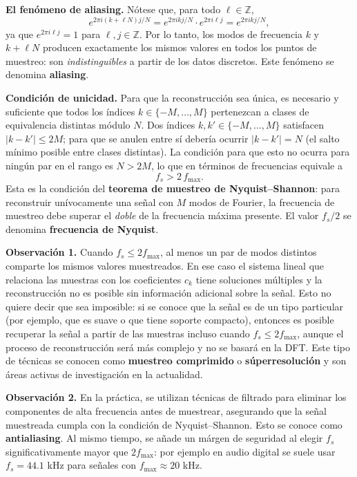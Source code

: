 \documentclass[12pt]{article}
\begin{document}
\medskip

\noindent\textbf{El fenómeno de aliasing.}
Nótese que, para todo $\ell \in \mathbb{Z}$,
\[
  e^{2\pi i (k + \ell N) j / N} = e^{2\pi i k j/N} \cdot e^{2\pi i \ell j} = e^{2\pi i k j/N},
\]
ya que $e^{2\pi i \ell j} = 1$ para $\ell, j \in \mathbb{Z}$. Por lo tanto, los modos de frecuencia $k$ y $k + \ell N$ producen exactamente los mismos valores en todos los puntos de muestreo: son \emph{indistinguibles} a partir de los datos discretos. Este fenómeno se denomina \textbf{aliasing}.

\medskip

\noindent\textbf{Condición de unicidad.}
Para que la reconstrucción sea única, es necesario y suficiente que todos los índices $k \in \{-M, \ldots, M\}$ pertenezcan a clases de equivalencia distintas módulo $N$. Dos índices $k, k' \in \{-M, \ldots, M\}$ satisfacen $|k - k'| \leq 2M$; para que se anulen entre sí debería ocurrir $|k - k'| = N$ (el salto mínimo posible entre clases distintas). La condición para que esto no ocurra para ningún par en el rango es $N > 2M$, lo que en términos de frecuencias equivale a
\[
  \boxed{f_s > 2\, f_{\max}.}
\]
Esta es la condición del \textbf{teorema de muestreo de Nyquist--Shannon}: para reconstruir unívocamente una señal con $M$ modos de Fourier, la frecuencia de muestreo debe superar el \emph{doble} de la frecuencia máxima presente. El valor $f_s/2$ se denomina \textbf{frecuencia de Nyquist}.

\medskip

\noindent\textbf{Observación 1.}  Cuando $f_s \leq 2 f_{\max}$, al menos un par de modos distintos comparte los mismos valores muestreados. En ese caso el sistema lineal que relaciona las muestras con los coeficientes $c_k$ tiene soluciones múltiples y la reconstrucción no es posible sin información adicional sobre la señal. Esto no quiere decir que sea imposible: si se conoce que la señal es de un tipo particular (por ejemplo, que es suave o que tiene soporte compacto), entonces es posible recuperar la señal a partir de las muestras incluso cuando $f_s \leq 2 f_{\max}$, aunque el proceso de reconstrucción será más complejo y no se basará en la DFT. Este tipo de técnicas se conocen como \textbf{muestreo comprimido} o \textbf{súperresolución} y son áreas activas de investigación en la actualidad.

\noindent\textbf{Observación 2.} En la práctica, se utilizan técnicas de filtrado para eliminar los componentes de alta frecuencia antes de muestrear, asegurando que la señal muestreada cumpla con la condición de Nyquist--Shannon. Esto se conoce como \textbf{antialiasing}. Al mismo tiempo, se añade un márgen de seguridad al elegir $f_s$ significativamente mayor que $2 f_{\max}$: por ejemplo en audio digital se suele usar $f_s = 44.1$ kHz para señales con $f_{\max} \approx 20$ kHz.
\end{document}
